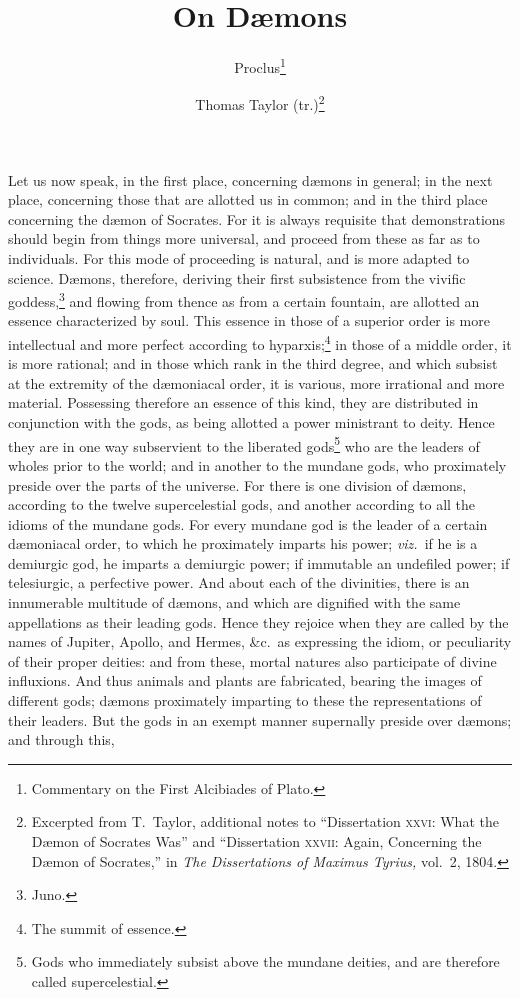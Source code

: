 \documentclass[12pt]{article}
\title{On D{\ae}mons}
\author{Proclus\footnote{Commentary on the First Alcibiades of Plato.} \and
Thomas Taylor (tr.)\footnote{Excerpted from T.~Taylor, additional notes to
``Dissertation \textsc{xxvi}: What the D{\ae}mon of Socrates Was'' and
``Dissertation \textsc{xxvii}: Again, Concerning the D{\ae}mon of Socrates,''
in \textit{The Dissertations of Maximus Tyrius,} vol.~2, 1804.}}
\date{}
\begin{document}
\maketitle

\noindent Let us now speak, in the first place, concerning d{\ae}mons in
general; in the next place, concerning those that are allotted us in common;
and in the third place concerning the d{\ae}mon of Socrates. For it is always
requisite that demonstrations should begin from things more universal, and
proceed from these as far as to individuals. For this mode of proceeding is
natural, and is more adapted to science. D{\ae}mons, therefore, deriving their
first subsistence from the vivific goddess,\footnote{Juno.} and flowing from
thence as from a certain fountain, are allotted an essence characterized by
soul. This essence in those of a superior order is more intellectual and more
perfect according to hyparxis;\footnote{The summit of essence.} in those of a
middle order, it is more rational; and in those which rank in the third degree,
and which subsist at the extremity of the d{\ae}moniacal order, it is various,
more irrational and more material. Possessing therefore an essence of this
kind, they are distributed in conjunction with the gods, as being allotted a
power ministrant to deity. Hence they are in one way subservient to the
liberated gods\footnote{Gods who immediately subsist above the mundane deities,
and are therefore called supercelestial.} who are the leaders of wholes prior
to the world; and in another to the mundane gods, who proximately preside over
the parts of the universe. For there is one division of d{\ae}mons, according
to the twelve supercelestial gods, and another according to all the idioms of
the mundane gods. For every mundane god is the leader of a certain
d{\ae}moniacal order, to which he proximately imparts his power;
\textit{viz.}~if he is a demiurgic god, he imparts a demiurgic power; if
immutable an undefiled power; if telesiurgic, a perfective power. And about
each of the divinities, there is an innumerable multitude of d{\ae}mons, and
which are dignified with the same appellations as their leading gods. Hence
they rejoice when they are called by the names of Jupiter, Apollo, and Hermes,
\&c.~as expressing the idiom, or peculiarity of their proper deities: and from
these, mortal natures also participate of divine influxions. And thus animals
and plants are fabricated, bearing the images of different gods; d{\ae}mons
proximately imparting to these the representations of their leaders. But the
gods in an exempt manner supernally preside over d{\ae}mons; and through this,
\end{document}
